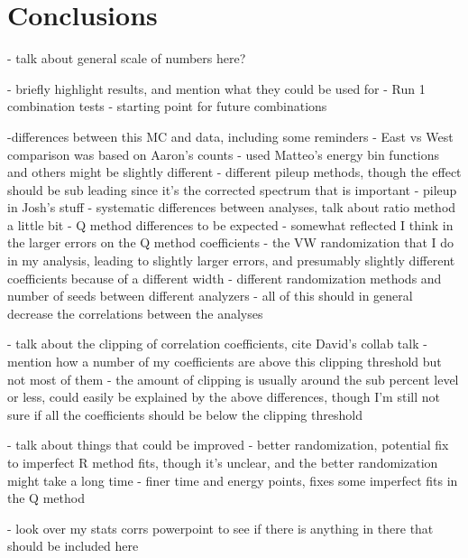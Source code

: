 
\graphicspath{{Body/Figures/}}

\clearpage
\section{Conclusions}

- talk about general scale of numbers here?

- briefly highlight results, and mention what they could be used for
	- Run 1 combination tests
	- starting point for future combinations

	


-differences between this MC and data, including some reminders
 - East vs West comparison was based on Aaron's counts
 - used Matteo's energy bin functions and others might be slightly different
 - different pileup methods, though the effect should be sub leading since it's the corrected spectrum that is important
 - pileup in Josh's stuff
 - systematic differences between analyses, talk about ratio method a little bit
 - Q method differences to be expected - somewhat reflected I think in the larger errors on the Q method coefficients
 - the VW randomization that I do in my analysis, leading to slightly larger errors, and presumably slightly different coefficients because of a different width
 - different randomization methods and number of seeds between different analyzers
- all of this should in general decrease the correlations between the analyses

- talk about the clipping of correlation coefficients, cite David's collab talk
	- mention how a number of my coefficients are above this clipping threshold but not most of them
	- the amount of clipping is usually around the sub percent level or less, could easily be explained by the above differences, though I'm still not sure if all the coefficients should be below the clipping threshold


- talk about things that could be improved
	- better randomization, potential fix to imperfect R method fits, though it's unclear, and the better randomization might take a long time
	- finer time and energy points, fixes some imperfect fits in the Q method


- look over my stats corrs powerpoint to see if there is anything in there that should be included here


